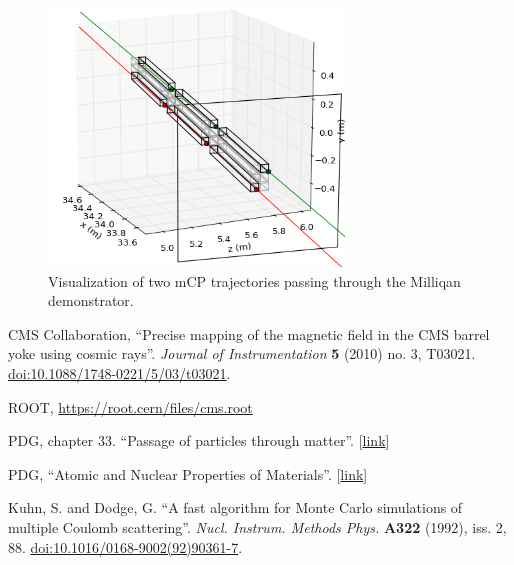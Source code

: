\documentclass[11pt]{article}
\begin{document}
\begin{figure}
\centering
\includegraphics[width=0.7\textwidth]{plots/traj_vis.png}
\caption{Visualization of two mCP trajectories passing through the Milliqan demonstrator.}
\label{fig:traj_vis}
\end{figure}


\begin{thebibliography}{1}

 CMS Collaboration, ``Precise mapping of the magnetic field in the CMS barrel yoke using cosmic rays''.
\emph{Journal of Instrumentation} {\bf 5} (2010) no. 3, T03021. \href{https://doi.org/10.1088\%2F1748-0221\%2F5\%2F03\%2Ft03021}{doi:10.1088/1748-0221/5/03/t03021}.

 ROOT, \href{https://root.cern/files/cms.root}{https://root.cern/files/cms.root}

  PDG, chapter 33. ``Passage of particles through matter''.
[\href{http://pdg.lbl.gov/2019/reviews/rpp2018-rev-passage-particles-matter.pdf}{link}]

  PDG, ``Atomic and Nuclear Properties of Materials''.
[\href{http://pdg.lbl.gov/2019/AtomicNuclearProperties/index.html}{link}]

 Kuhn, S. and Dodge, G. ``A fast algorithm for Monte Carlo simulations of multiple Coulomb scattering''.
\emph{Nucl. Instrum. Methods Phys.} {\bf A322} (1992), iss. 2, 88. \href{https://doi.org/10.1016/0168-9002(92)90361-7}{doi:10.1016/0168-9002(92)90361-7}.

\end{thebibliography}
  
\end{document}
